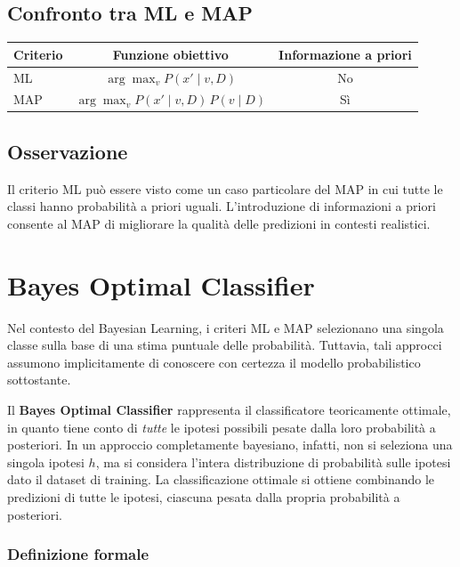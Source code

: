 \documentclass[a4paper,12pt]{report}
\begin{document}
\subsection*{Confronto tra ML e MAP}

\begin{center}
\begin{tabular}{l|c|c}
\textbf{Criterio} & \textbf{Funzione obiettivo} & \textbf{Informazione a priori} \\
\hline
ML & \( \arg\max_v P(x' \mid v, D) \) & No \\
MAP & \( \arg\max_v P(x' \mid v, D)\,P(v \mid D) \) & Sì \\
\end{tabular}
\end{center}

\subsection*{Osservazione}

Il criterio ML può essere visto come un caso particolare del MAP in cui tutte le classi hanno probabilità a priori uguali.
L’introduzione di informazioni a priori consente al MAP di migliorare la qualità delle predizioni in contesti realistici.

\section{Bayes Optimal Classifier}

Nel contesto del Bayesian Learning, i criteri ML e MAP selezionano una singola classe sulla base di una stima puntuale delle probabilità.
Tuttavia, tali approcci assumono implicitamente di conoscere con certezza il modello probabilistico sottostante.

Il \textbf{Bayes Optimal Classifier} rappresenta il classificatore teoricamente ottimale, in quanto tiene conto di \emph{tutte} le ipotesi possibili pesate dalla loro probabilità a posteriori.
In un approccio completamente bayesiano, infatti, non si seleziona una singola ipotesi \( h \), ma si considera l’intera distribuzione di probabilità sulle ipotesi dato il dataset di training.
La classificazione ottimale si ottiene combinando le predizioni di tutte le ipotesi, ciascuna pesata dalla propria probabilità a posteriori.

\subsubsection{Definizione formale}
\end{document}
